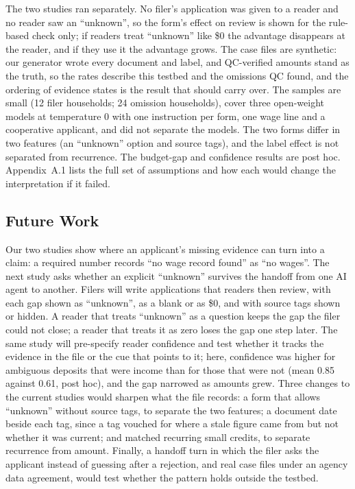 \documentclass[sigconf,nonacm,screen]{acmart}
\begin{document}
The two studies ran separately. No filer's application was given to a reader and no reader saw an ``unknown'', so the form's effect on review is shown for the rule-based check only; if readers treat ``unknown'' like \$0 the advantage disappears at the reader, and if they use it the advantage grows. The case files are synthetic: our generator wrote every document and label, and QC-verified amounts stand as the truth, so the rates describe this testbed and the omissions QC found, and the ordering of evidence states is the result that should carry over. The samples are small (12 filer households; 24 omission households), cover three open-weight models at temperature 0 with one instruction per form, one wage line and a cooperative applicant, and did not separate the models. The two forms differ in two features (an ``unknown'' option and source tags), and the label effect is not separated from recurrence. The budget-gap and confidence results are post hoc. Appendix~A.1 lists the full set of assumptions and how each would change the interpretation if it failed.

\subsection{Future Work}

Our two studies show where an applicant's missing evidence can turn into a claim: a required number records ``no wage record found'' as ``no wages''. The next study asks whether an explicit ``unknown'' survives the handoff from one AI agent to another. Filers will write applications that readers then review, with each gap shown as ``unknown'', as a blank or as \$0, and with source tags shown or hidden. A reader that treats ``unknown'' as a question keeps the gap the filer could not close; a reader that treats it as zero loses the gap one step later. The same study will pre-specify reader confidence and test whether it tracks the evidence in the file or the cue that points to it; here, confidence was higher for ambiguous deposits that were income than for those that were not (mean 0.85 against 0.61, post hoc), and the gap narrowed as amounts grew. Three changes to the current studies would sharpen what the file records: a form that allows ``unknown'' without source tags, to separate the two features; a document date beside each tag, since a tag vouched for where a stale figure came from but not whether it was current; and matched recurring small credits, to separate recurrence from amount. Finally, a handoff turn in which the filer asks the applicant instead of guessing after a rejection, and real case files under an agency data agreement, would test whether the pattern holds outside the testbed.
\end{document}
